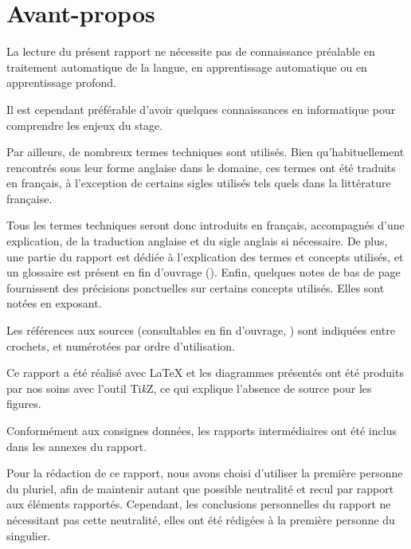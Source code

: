 \section*{Avant-propos} %
La lecture du présent rapport ne nécessite pas de connaissance préalable en traitement automatique de la langue, en apprentissage automatique ou en apprentissage profond.

Il est cependant préférable d'avoir quelques connaissances en informatique pour comprendre les enjeux du stage.

Par ailleurs, de nombreux termes techniques sont utilisés.
Bien qu'habituellement rencontrés sous leur forme anglaise dans le domaine, ces termes ont été traduits en français, à l'exception de certains sigles utilisés tels quels dans la littérature française.

Tous les termes techniques seront donc introduits en français, accompagnés d'une explication, de la traduction anglaise et du sigle anglais si nécessaire.
De plus, une partie du rapport est dédiée à l'explication des termes et concepts utilisés, et un glossaire est présent en fin d'ouvrage ().
Enfin, quelques notes de bas de page fournissent des précisions ponctuelles sur certains concepts utilisés. Elles sont notées en exposant. 

Les références aux sources (consultables en fin d'ouvrage, ) sont indiquées entre crochets, et numérotées par ordre d'utilisation.

Ce rapport a été réalisé avec \LaTeX{} et les diagrammes présentés ont été produits par nos soins avec l'outil Ti\textit{k}Z, ce qui explique l'absence de source pour les figures.

Conformément aux consignes données, les rapports intermédiaires ont été inclus dans les annexes du rapport.

Pour la rédaction de ce rapport, nous avons choisi d'utiliser la première personne du pluriel, afin de maintenir autant que possible neutralité et recul par rapport aux éléments rapportés. Cependant, les conclusions personnelles du rapport ne nécessitant pas cette neutralité, elles ont été rédigées à la première personne du singulier.
